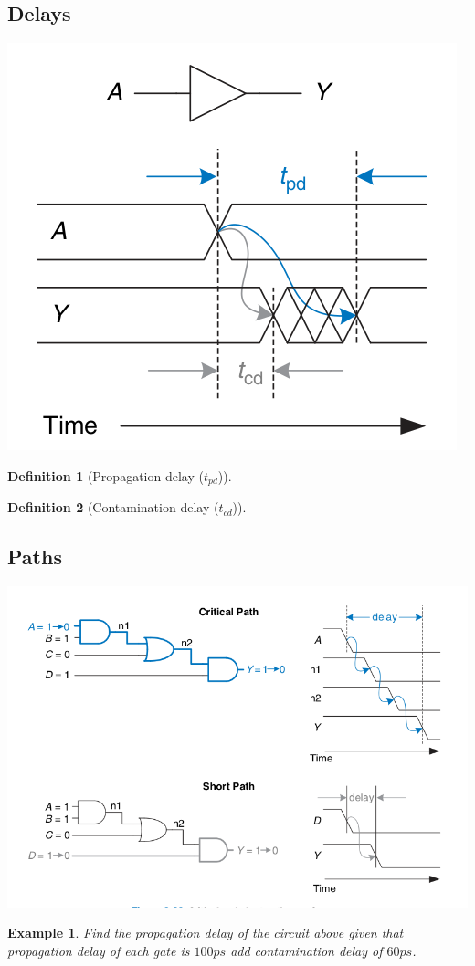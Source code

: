 \documentclass{article}
\newtheorem{example}{Example}
\newtheorem{definition}{Definition}
\begin{document}
\subsection{Delays}
\includegraphics[width=0.5\linewidth]{fig/fig2.67-delays-tpd-tcd.png}
\begin{definition}[Propagation delay ($t_{pd}$)]
\end{definition}
\vspace{5em}

\begin{definition}[Contamination delay ($t_{cd}$)]
\end{definition}
\vspace{5em}

\subsection{Paths}
\includegraphics[width=0.8\linewidth]{fig/fig2.68-short-path-and-critical-path.png}
\begin{example}
  Find the propagation delay of the circuit above given that propagation delay
  of each gate is $100 ps$  add contamination delay of $60ps$.
\end{example}
\vspace{10em}
\end{document}
